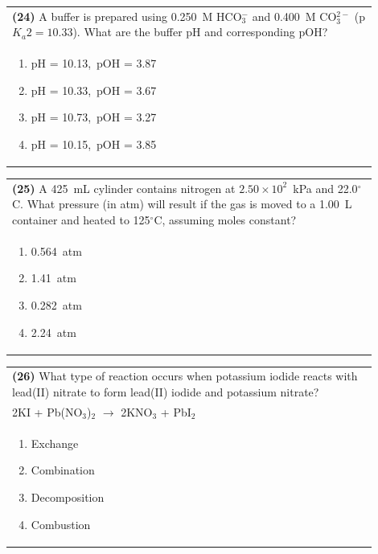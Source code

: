 \documentclass{article}
\begin{document}
\noindent\begin{tabular}{|p{0.9\linewidth}|}
\hline
\textbf{(24)} A buffer is prepared using 0.250~M HCO$_3^-$ and 0.400~M CO$_3^{2-}$ (p$K_a2 = 10.33$). What are the buffer pH and corresponding pOH?\\[0.2cm]
\begin{minipage}[t]{0.85\linewidth}
\begin{enumerate}[label=\alph*.]
\item pH = 10.13,\ pOH = 3.87
\item pH = 10.33,\ pOH = 3.67
\item pH = 10.73,\ pOH = 3.27
\item pH = 10.15,\ pOH = 3.85
\end{enumerate}
\end{minipage}\\[0.2cm]
\hline
\end{tabular}

\noindent\begin{tabular}{|p{0.9\linewidth}|}
\hline
\textbf{(25)} A 425~mL cylinder contains nitrogen at $2.50\times10^{2}$~kPa and 22.0$^\circ$C. What pressure (in atm) will result if the gas is moved to a 1.00~L container and heated to 125$^\circ$C, assuming moles constant?\\[0.2cm]

\begin{minipage}[t]{0.85\linewidth}
\begin{enumerate}[label=\alph*.]
\item 0.564~atm
\item 1.41~atm
\item 0.282~atm
\item 2.24~atm
\end{enumerate}
\end{minipage}\\[0.2cm]
\hline
\end{tabular}

\noindent\begin{tabular}{|p{0.9\linewidth}|}
\hline
\textbf{(26)} What type of reaction occurs when potassium iodide reacts with lead(II) nitrate to form lead(II) iodide and potassium nitrate?\\[0.2cm]
2KI + Pb(NO$_3$)$_2$ $\rightarrow$ 2KNO$_3$ + PbI$_2$\\[0.2cm]
\begin{minipage}[t]{0.85\linewidth}
\begin{enumerate}[label=\alph*.]
\item Exchange
\item Combination
\item Decomposition
\item Combustion
\end{enumerate}
\end{minipage}\\[0.2cm]
\hline
\end{tabular}
\end{document}
